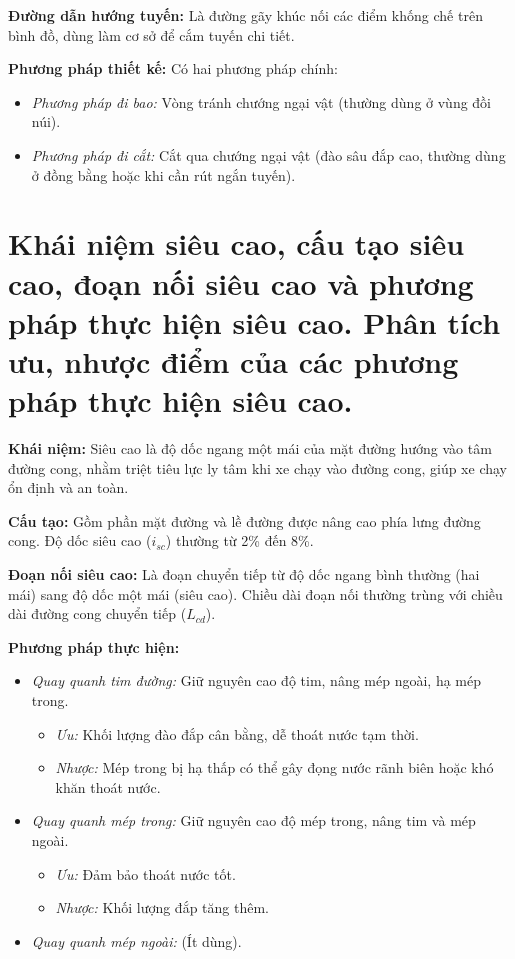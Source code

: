\documentclass[12pt,a4paper]{article}
\begin{document}
\textbf{Đường dẫn hướng tuyến:} Là đường gãy khúc nối các điểm khống chế trên bình đồ, dùng làm cơ sở để cắm tuyến chi tiết.

\textbf{Phương pháp thiết kế:} Có hai phương pháp chính:
\begin{itemize}
    \item \textit{Phương pháp đi bao:} Vòng tránh chướng ngại vật (thường dùng ở vùng đồi núi).
    \item \textit{Phương pháp đi cắt:} Cắt qua chướng ngại vật (đào sâu đắp cao, thường dùng ở đồng bằng hoặc khi cần rút ngắn tuyến).
\end{itemize}

\section{Khái niệm siêu cao, cấu tạo siêu cao, đoạn nối siêu cao và phương pháp thực hiện siêu cao. Phân tích ưu, nhược điểm của các phương pháp thực hiện siêu cao.}
\textbf{Khái niệm:} Siêu cao là độ dốc ngang một mái của mặt đường hướng vào tâm đường cong, nhằm triệt tiêu lực ly tâm khi xe chạy vào đường cong, giúp xe chạy ổn định và an toàn.

\textbf{Cấu tạo:} Gồm phần mặt đường và lề đường được nâng cao phía lưng đường cong. Độ dốc siêu cao ($i_{sc}$) thường từ 2\% đến 8\%.

\textbf{Đoạn nối siêu cao:} Là đoạn chuyển tiếp từ độ dốc ngang bình thường (hai mái) sang độ dốc một mái (siêu cao). Chiều dài đoạn nối thường trùng với chiều dài đường cong chuyển tiếp ($L_{cd}$).

\textbf{Phương pháp thực hiện:}
\begin{itemize}
    \item \textit{Quay quanh tim đường:} Giữ nguyên cao độ tim, nâng mép ngoài, hạ mép trong.
        \begin{itemize}
            \item \textit{Ưu:} Khối lượng đào đắp cân bằng, dễ thoát nước tạm thời.
            \item \textit{Nhược:} Mép trong bị hạ thấp có thể gây đọng nước rãnh biên hoặc khó khăn thoát nước.
        \end{itemize}
    \item \textit{Quay quanh mép trong:} Giữ nguyên cao độ mép trong, nâng tim và mép ngoài.
        \begin{itemize}
            \item \textit{Ưu:} Đảm bảo thoát nước tốt.
            \item \textit{Nhược:} Khối lượng đắp tăng thêm.
        \end{itemize}
    \item \textit{Quay quanh mép ngoài:} (Ít dùng).
\end{itemize}
\end{document}
